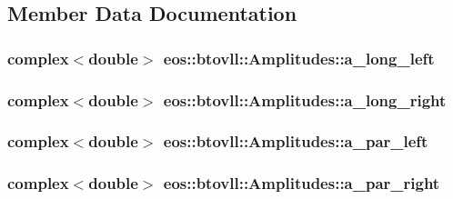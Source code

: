 \subsection{Member Data Documentation}
\hypertarget{structeos_1_1btovll_1_1Amplitudes_a445006044e0547c19cece86890159ce7}{
\subsubsection[{a\_\-long\_\-left}]{\setlength{\rightskip}{0pt plus 5cm}complex$<$double$>$ {\bf eos::btovll::Amplitudes::a\_\-long\_\-left}}}
\label{structeos_1_1btovll_1_1Amplitudes_a445006044e0547c19cece86890159ce7}
\hypertarget{structeos_1_1btovll_1_1Amplitudes_a6b459929fb4284d7e947b837390dc07a}{
\subsubsection[{a\_\-long\_\-right}]{\setlength{\rightskip}{0pt plus 5cm}complex$<$double$>$ {\bf eos::btovll::Amplitudes::a\_\-long\_\-right}}}
\label{structeos_1_1btovll_1_1Amplitudes_a6b459929fb4284d7e947b837390dc07a}
\hypertarget{structeos_1_1btovll_1_1Amplitudes_a734ff0455a740eeb8d481c0b09c15b7b}{
\subsubsection[{a\_\-par\_\-left}]{\setlength{\rightskip}{0pt plus 5cm}complex$<$double$>$ {\bf eos::btovll::Amplitudes::a\_\-par\_\-left}}}
\label{structeos_1_1btovll_1_1Amplitudes_a734ff0455a740eeb8d481c0b09c15b7b}
\hypertarget{structeos_1_1btovll_1_1Amplitudes_aefccd00f09f49f4c3ae585d232786cfc}{
\subsubsection[{a\_\-par\_\-right}]{\setlength{\rightskip}{0pt plus 5cm}complex$<$double$>$ {\bf eos::btovll::Amplitudes::a\_\-par\_\-right}}}
